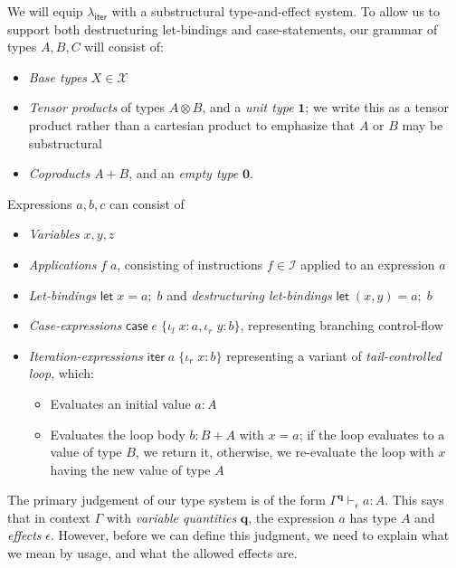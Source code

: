 \documentclass[acmsmall,screen,review]{acmart}
\newcommand{\mc}[1]{\ensuremath{\mathcal{#1}}}
\newcommand{\mb}[1]{\ensuremath{\mathbf{#1}}}
\newcommand{\ms}[1]{\ensuremath{\mathsf{#1}}}
\newcommand{\lto}{:}
\newcommand{\linl}[1]{\iota_l\;{#1}}
\newcommand{\linr}[1]{\iota_r\;{#1}}
\newcommand{\letexpr}[3]{\ensuremath{\ms{let}\;#1 = #2;\;#3}}
\newcommand{\caseexpr}[5]{\ms{case}\;#1\;\{\linl{#2} \lto #3, \linr{#4} \lto #5\}}
\newcommand{\liter}[3]{\ms{iter}\;#1\;\{ \linr{#2} \lto #3 \}}
\newcommand{\hasty}[4]{#1 \vdash_{#2} #3: {#4}}
\newcommand{\subiterexp}{\(\lambda_{\ms{iter}}\)}
\begin{document}
We will equip \subiterexp{} with a substructural type-and-effect system. To allow us to support both
destructuring let-bindings and case-statements, our grammar of types $A, B, C$ will consist of:
\begin{itemize}
  \item \emph{Base types} $X \in \mc{X}$
  \item \emph{Tensor products} of types $A \otimes B$, and a \emph{unit type} $\mb{1}$; we write
  this as a tensor product rather than a cartesian product to emphasize that $A$ or $B$ may be
  substructural
  \item \emph{Coproducts} $A + B$, and an \emph{empty type} $\mb{0}$.
\end{itemize}

Expressions $a, b, c$ can consist of
\begin{itemize}
  \item \emph{Variables} $x, y, z$
  \item \emph{Applications} $f\;a$, consisting of instructions $f \in \mc{I}$ applied to an
  expression $a$
  \item \emph{Let-bindings} $\letexpr{x}{a}{b}$ and \emph{destructuring let-bindings} $\letexpr{(x,
  y)}{a}{b}$
  \item \emph{Case-expressions} $\caseexpr{e}{x}{a}{y}{b}$, representing branching control-flow
  \item \emph{Iteration-expressions} $\liter{a}{x}{b}$ representing a variant of
  \emph{tail-controlled loop}, which:
  \begin{itemize}
    \item Evaluates an initial value $a : A$
    \item Evaluates the loop body $b : B + A$ with $x = a$; if the loop evaluates to a value of type
    $B$, we return it, otherwise, we re-evaluate the loop with $x$ having the new value of type $A$
  \end{itemize}
\end{itemize}

The primary judgement of our type system is of the form $\hasty{\Gamma^{\mb{q}}}{\epsilon}{a}{A}$.
This says that in context $\Gamma$ with \emph{variable quantities} $\mb{q}$, the expression $a$ has
type $A$ and \emph{effects} $\epsilon$. However, before we can define this judgment, we need to
explain what we mean by usage, and what the allowed effects are. 
\end{document}
